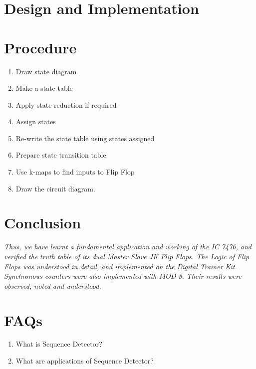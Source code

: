 \documentclass[11pt]{article}
\begin{document}
\section{Design and Implementation}




\section{Procedure}

\begin{enumerate}
	\item Draw state diagram
	\item Make a state table
	\item Apply state reduction if required
	\item Assign states 
	\item Re-write the state table using states assigned
	\item Prepare state transition table
	\item Use k-maps to find inputs to Flip Flop
	\item Draw the circuit diagram.
	
\end{enumerate}

\section{Conclusion}
\textit{Thus, we have learnt a fundamental application and working of the IC 7476, and verified the truth table of its dual Master Slave JK Flip Flops. The Logic of Flip Flops was understood in detail, and implemented on the Digital Trainer Kit. Synchronous counters were also implemented with MOD 8. Their results were observed, noted and understood. }
\pagebreak

\section{FAQs}

\begin{enumerate}
	\item What is Sequence Detector?
	
	
	\item What are applications of Sequence Detector?
	
	


	
\end{enumerate}
\end{document}

